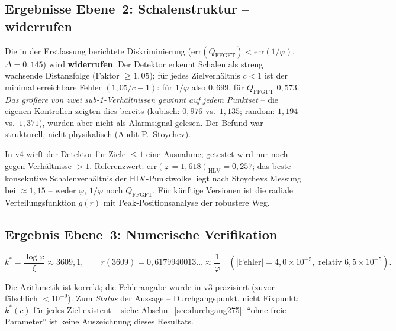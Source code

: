 \subsection{Ergebnisse Ebene~2: Schalenstruktur -- widerrufen}\label{sec:ebene2-275}

\begin{remark}
Die in der Erstfassung berichtete Diskriminierung
($\mathrm{err}(Q_\mathrm{FFGFT}) < \mathrm{err}(1/\varphi)$,
$\Delta = 0{,}145$) wird \textbf{widerrufen}. Der Detektor erkennt
Schalen als streng wachsende Distanzfolge (Faktor $\geq 1{,}05$);
für jedes Zielverhältnis $c<1$ ist der minimal erreichbare Fehler
$(1{,}05/c - 1)$: für $1/\varphi$ also $0{,}699$, für $Q_\mathrm{FFGFT}$
$0{,}573$. \emph{Das größere von zwei sub-1-Verhältnissen gewinnt auf
jedem Punktset} -- die eigenen Kontrollen zeigten dies bereits
(kubisch: $0{,}976$ vs.\ $1{,}135$; random: $1{,}194$ vs.\ $1{,}371$),
wurden aber nicht als Alarmsignal gelesen. Der Befund war strukturell,
nicht physikalisch (Audit P.~Stoychev).
\end{remark}

In v4 wirft der Detektor für Ziele $\leq 1$ eine Ausnahme; getestet
wird nur noch gegen Verhältnisse $>1$. Referenzwert:
$\mathrm{err}(\varphi{=}1{,}618)_\mathrm{HLV} = 0{,}257$;
das beste konsekutive Schalenverhältnis der HLV-Punktwolke liegt nach
Stoychevs Messung bei $\approx 1{,}15$ -- weder $\varphi$, $1/\varphi$
noch $Q_\mathrm{FFGFT}$. Für künftige Versionen ist die radiale
Verteilungsfunktion $g(r)$ mit Peak-Positionsanalyse der robustere Weg.

\subsection{Ergebnis Ebene~3: Numerische Verifikation}

\begin{equation}
  k^* = \frac{\log\varphi}{\xi} \approx 3609{,}1, \qquad
  r(3609) = 0{,}6179940013\ldots \approx \frac{1}{\varphi}
  \quad (|\text{Fehler}| = 4{,}0\times10^{-5},
  \text{ relativ } 6{,}5\times10^{-5}).
\end{equation}

Die Arithmetik ist korrekt; die Fehlerangabe wurde in v3 präzisiert
(zuvor fälschlich $<10^{-9}$). Zum \emph{Status} der Aussage --
Durchgangspunkt, nicht Fixpunkt; $k^*(c)$ für jedes Ziel existent --
siehe Abschn.~\ref{sec:durchgang275}: \enquote{ohne freie Parameter}
ist keine Auszeichnung dieses Resultats.

